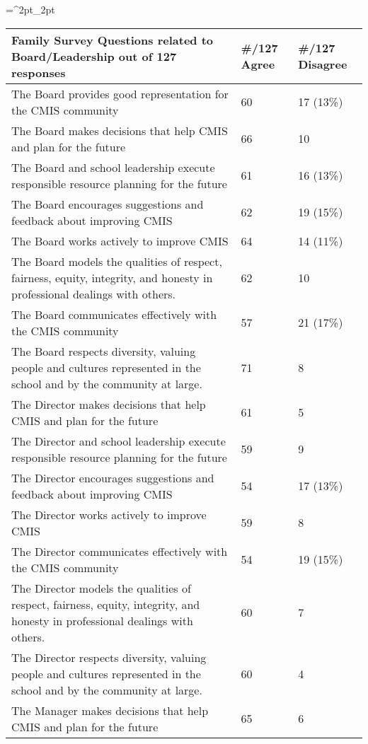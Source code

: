 \begin{table}[h]
\tiny
\caption{Family Survey of Board/Leadership}
\label{table:14}
\tabulinesep=^2pt_2pt
\begin{longtabu}{|X[8]|X|X|}
\hline
Family Survey Questions related to Board/Leadership out of 127 responses &
\#/127 Agree &
\#/127 Disagree \\
\hline
The Board provides good representation for the CMIS community &
60 &
17 (13\%) \\
\hline
The Board makes decisions that help CMIS and plan for the future &
66 &
10 \\
\hline
The Board and school leadership execute responsible resource planning for the future &
61 &
16 (13\%) \\
\hline
The Board encourages suggestions and feedback about improving CMIS &
62 &
19 (15\%) \\
\hline
The Board works actively to improve CMIS &
64 &
14 (11\%) \\
\hline
The Board models the qualities of respect, fairness, equity, integrity, and honesty in professional dealings with others. &
62 &
10 \\
\hline
The Board communicates effectively with the CMIS community &
57 &
21 (17\%) \\
\hline
The Board respects diversity, valuing people and cultures represented in the school and by the community at large. &
71 &
8 \\
\hline
The Director makes decisions that help CMIS and plan for the future &
61 &
5 \\
\hline
The Director and school leadership execute responsible resource planning for the future &
59 &
9 \\
\hline
The Director encourages suggestions and feedback about improving CMIS &
54 &
17 (13\%) \\
\hline
The Director works actively to improve CMIS &
59 &
8 \\
\hline
The Director communicates effectively with the CMIS community &
54 &
19 (15\%) \\
\hline
The Director models the qualities of respect, fairness, equity, integrity, and honesty in professional dealings with others. &
60 &
7 \\
\hline
The Director respects diversity, valuing people and cultures represented in the school and by the community at large. &
60 &
4 \\
\hline
The Manager makes decisions that help CMIS and plan for the future &
65 &
6 \\

\end{longtabu}
\end{table}
